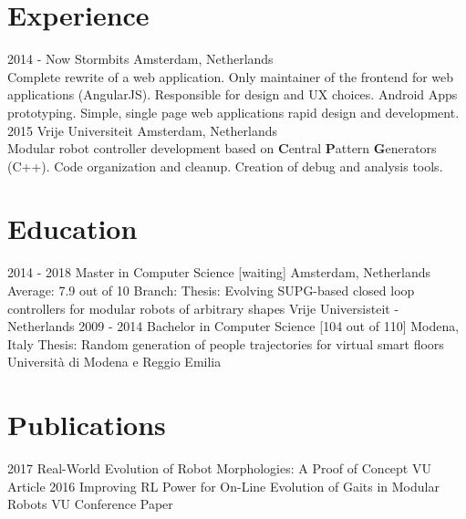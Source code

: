 \documentclass[]{cv-style} %
\begin{document}
\section{Experience}
\begin{entrylist}
\entry
  {2014 - Now}
  {Stormbits}
  {Amsterdam, Netherlands}
  {\\
Complete rewrite of a web application. Only maintainer of the frontend for web applications (AngularJS). Responsible for design and UX choices. Android Apps prototyping. Simple, single page web applications rapid design and development.}
\entry
  {2015}
  {Vrije Universiteit}
  {Amsterdam, Netherlands}
  {\\
Modular robot controller development based on \textbf{C}entral \textbf{P}attern \textbf{G}enerators (C++). Code organization and cleanup. Creation of debug and analysis tools.\\}
\end{entrylist}

\section{Education}
\begin{entrylist}
\entry
{2014 - 2018}
{Master {\normalfont in Computer Science [waiting]}}
{Amsterdam, Netherlands}
{Average: 7.9 out of 10\newline
Branch: \newline
Thesis: Evolving SUPG-based closed loop controllers for modular robots of arbitrary shapes\newline
Vrije Universisteit - Netherlands}
\entry
{2009 - 2014}
{Bachelor {\normalfont in Computer Science [104 out of 110]}}
{Modena, Italy}
{Thesis: Random generation of people trajectories for virtual smart floors\newline
Università di Modena e Reggio Emilia}
\end{entrylist}

\section{Publications}
\begin{entrylist}
\entry
{2017}
{Real-World Evolution of Robot Morphologies: A Proof of Concept}
{VU}
{Article}
\entry
{2016}
{Improving RL Power for On-Line Evolution of Gaits in Modular Robots}
{VU}
{Conference Paper}
\end{entrylist}
\end{document}
